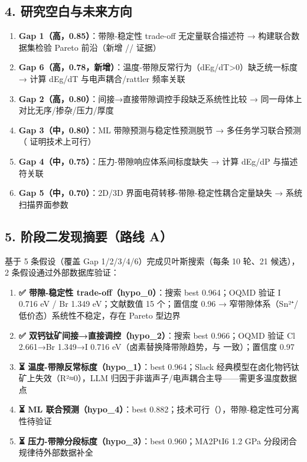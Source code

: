 \documentclass[12pt,a4paper]{ctexart}
\providecommand{\tightlist}{%
  \setlength{\itemsep}{0pt}\setlength{\parskip}{0pt}}
\begin{document}
\subsection{4. 研究空白与未来方向}\label{ux7814ux7a76ux7a7aux767dux4e0eux672aux6765ux65b9ux5411}

\begin{enumerate}
\def\labelenumi{\arabic{enumi}.}
\tightlist
\item
  \textbf{Gap 1（高，0.85）}：带隙-稳定性 trade-off 无定量联合描述符 → 构建联合数据集检验 Pareto 前沿（新增 \cite{p50}/\cite{p57}/\cite{p65} 证据）
\item
  \textbf{Gap 6（高，0.78，新增）}：温度-带隙反常行为（dEg/dT\textgreater0）缺乏统一标度 → 计算 dEg/dT 与电声耦合/rattler 频率关联
\item
  \textbf{Gap 2（高，0.80）}：间接→直接带隙调控手段缺乏系统性比较 → 同一母体上对比无序/掺杂/压力/厚度
\item
  \textbf{Gap 3（中，0.80）}：ML 带隙预测与稳定性预测脱节 → 多任务学习联合预测（\cite{p60} 证明技术上可行）
\item
  \textbf{Gap 4（中，0.75）}：压力-带隙响应体系间标度缺失 → 计算 dEg/dP 与描述符关联
\item
  \textbf{Gap 5（中，0.70）}：2D/3D 界面电荷转移-带隙-稳定性耦合定量缺失 → 系统扫描界面参数
\end{enumerate}

\subsection{5. 阶段二发现摘要（路线 A）}\label{ux9636ux6bb5ux4e8cux53d1ux73b0ux6458ux8981ux8defux7ebf-a}

基于 5 条假设（覆盖 Gap 1/2/3/4/6）完成贝叶斯搜索（每条 10 轮、21 候选），2 条假设通过外部数据库验证：

\begin{enumerate}
\def\labelenumi{\arabic{enumi}.}
\tightlist
\item
  \textbf{✅ 带隙-稳定性 trade-off（hypo\_0）}：搜索 best 0.964；OQMD 验证 I 0.716 eV / Br 1.349 eV；文献数值 15 个；置信度 0.96 → 窄带隙体系（Sn²⁺/低价态）系统性不稳定，存在 Pareto 型边界
\item
  \textbf{✅ 双钙钛矿间接→直接调控（hypo\_2）}：搜索 best 0.966；OQMD 验证 Cl 2.661→Br 1.349→I 0.716 eV（卤素替换降带隙趋势，与 \cite{p66} 一致）；置信度 0.97
\item
  \textbf{⏳ 温度-带隙反常标度（hypo\_1）}：best 0.964；Slack 经典模型在卤化物钙钛矿上失效（R²≈0），LLM 归因于非谐声子/电声耦合主导------需更多温度数据点
\item
  \textbf{⏳ ML 联合预测（hypo\_4）}：best 0.882；技术可行（\cite{p60}），带隙-稳定性可分离性待验证
\item
  \textbf{⏳ 压力-带隙分段标度（hypo\_3）}：best 0.960；MA2PtI6 1.2 GPa 分段闭合规律待外部数据补全
\end{enumerate}
\end{document}
